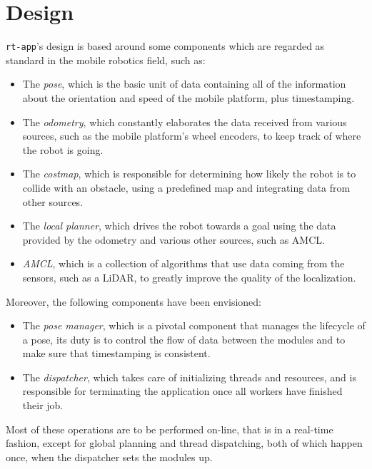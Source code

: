 \documentclass[a4paper,12pt]{report}
\begin{document}
\section{Design}


\texttt{rt-app}'s design is based around some components which are regarded as standard in the mobile robotics field, such as:
\begin{itemize}
    \item The \textit{pose}, which is the basic unit of data containing all of the information about the orientation and speed of the mobile platform, plus timestamping.
    \item The \textit{odometry}, which constantly elaborates the data received from various sources, such as the mobile platform's wheel encoders, to keep track of where the robot is going.
    \item The \textit{costmap}, which is responsible for determining how likely the robot is to collide with an obstacle, using a predefined map and integrating data from other sources.
    \item The \textit{local planner}, which drives the robot towards a goal using the data provided by the odometry and various other sources, such as AMCL.
    \item \textit{AMCL}, which is a collection of algorithms that use data coming from the sensors, such as a LiDAR, to greatly improve the quality of the localization\cite{roswiki-amcl}.
\end{itemize}

Moreover, the following components have been envisioned:
\begin{itemize}
  \item The \textit{pose manager}, which is a pivotal component that manages the lifecycle of a pose, its duty is to control the flow of data between the modules and to make sure that timestamping is consistent.
  \item The \textit{dispatcher}, which takes care of initializing threads and resources, and is responsible for terminating the application once all workers have finished their job.
\end{itemize}

Most of these operations are to be performed on-line, that is in a real-time fashion, except for global planning and thread dispatching, both of which happen once, when the dispatcher sets the modules up.
\end{document}
